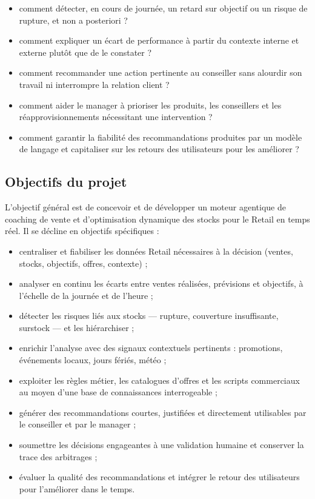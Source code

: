 \begin{itemize}[label=--]
    \item comment détecter, en cours de journée, un retard sur objectif ou un risque de rupture, et non a posteriori ?
    \item comment expliquer un écart de performance à partir du contexte interne et externe plutôt que de le constater ?
    \item comment recommander une action pertinente au conseiller sans alourdir son travail ni interrompre la relation client ?
    \item comment aider le manager à prioriser les produits, les conseillers et les réapprovisionnements nécessitant une intervention ?
    \item comment garantir la fiabilité des recommandations produites par un modèle de langage et capitaliser sur les retours des utilisateurs pour les améliorer ?
\end{itemize}

\subsection{Objectifs du projet}

L'objectif général est de concevoir et de développer un moteur agentique de coaching de vente et d'optimisation dynamique des stocks pour le Retail en temps réel. Il se décline en objectifs spécifiques :

\begin{itemize}[label=--]
    \item centraliser et fiabiliser les données Retail nécessaires à la décision (ventes, stocks, objectifs, offres, contexte) ;
    \item analyser en continu les écarts entre ventes réalisées, prévisions et objectifs, à l'échelle de la journée et de l'heure ;
    \item détecter les risques liés aux stocks — rupture, couverture insuffisante, surstock — et les hiérarchiser ;
    \item enrichir l'analyse avec des signaux contextuels pertinents : promotions, événements locaux, jours fériés, météo ;
    \item exploiter les règles métier, les catalogues d'offres et les scripts commerciaux au moyen d'une base de connaissances interrogeable ;
    \item générer des recommandations courtes, justifiées et directement utilisables par le conseiller et par le manager ;
    \item soumettre les décisions engageantes à une validation humaine et conserver la trace des arbitrages ;
    \item évaluer la qualité des recommandations et intégrer le retour des utilisateurs pour l'améliorer dans le temps.
\end{itemize}

